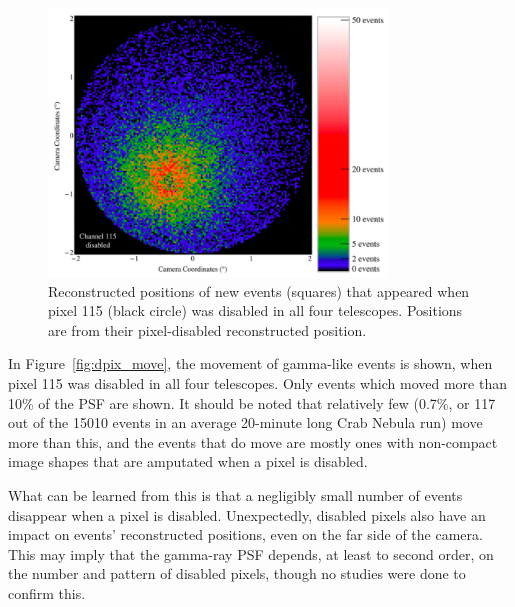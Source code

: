 \begin{figure}[!ht]
  \centering
  \includegraphics[width=0.8\textwidth]{images/disabled_pixel/appearing_events}
  \caption[New Events that Appear when Disabling Camera Pixels]{
    Reconstructed positions of new events (squares) that appeared when pixel 115 (black circle) was disabled in all four telescopes.
    Positions are from their pixel-disabled reconstructed position.
  }
  \label{fig:dpix_appear}
\end{figure}

In Figure~\ref{fig:dpix_move}, the movement of gamma-like events is shown, when pixel 115 was disabled in all four telescopes.
Only events which moved more than 10\% of the PSF are shown.
It should be noted that relatively few (0.7\%, or 117 out of the 15010 events in an average 20-minute long Crab Nebula run) move more than this, and the events that do move are mostly ones with non-compact image shapes that are amputated when a pixel is disabled.

What can be learned from this is that a negligibly small number of events disappear when a pixel is disabled.
Unexpectedly, disabled pixels also have an impact on events' reconstructed positions, even on the far side of the camera.
This may imply that the gamma-ray PSF depends, at least to second order, on the number and pattern of disabled pixels, though no studies were done to confirm this.

